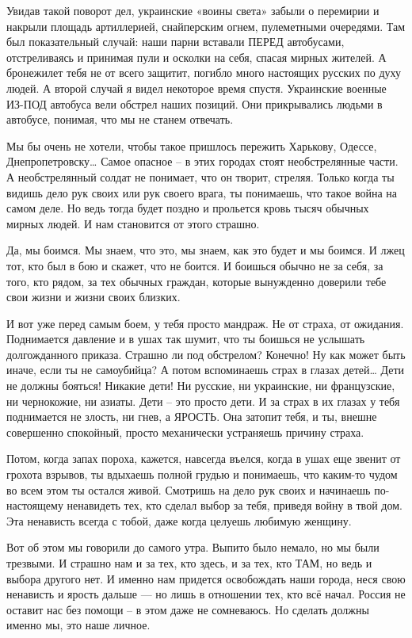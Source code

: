 Увидав такой поворот дел, украинские «воины света» забыли о перемирии и накрыли
площадь артиллерией, снайперским огнем, пулеметными очередями. Там был
показательный случай: наши парни вставали ПЕРЕД автобусами, отстреливаясь и
принимая пули и осколки на себя, спасая мирных жителей. А бронежилет тебя не от
всего защитит, погибло много настоящих русских по духу людей. А второй случай я
видел некоторое время спустя. Украинские военные ИЗ-ПОД автобуса вели обстрел
наших позиций. Они прикрывались людьми в автобусе, понимая, что мы не станем
отвечать.

Мы бы очень не хотели, чтобы такое пришлось пережить Харькову, Одессе,
Днепропетровску… Самое опасное – в этих городах стоят необстрелянные части. А
необстрелянный солдат не понимает, что он творит, стреляя. Только когда ты
видишь дело рук своих или рук своего врага, ты понимаешь, что такое война на
самом деле. Но ведь тогда будет поздно и прольется кровь тысяч обычных мирных
людей. И нам становится от этого страшно.

Да, мы боимся. Мы знаем, что это, мы знаем, как это будет и мы боимся. И лжец
тот, кто был в бою и скажет, что не боится. И боишься обычно не за себя, за
того, кто рядом, за тех обычных граждан, которые вынужденно доверили тебе свои
жизни и жизни своих близких.

И вот уже перед самым боем, у тебя просто мандраж. Не от страха, от ожидания.
Поднимается давление и в ушах так шумит, что ты боишься не услышать
долгожданного приказа. Страшно ли под обстрелом? Конечно! Ну как может быть
иначе, если ты не самоубийца? А потом вспоминаешь страх в глазах детей… Дети не
должны бояться! Никакие дети! Ни русские, ни украинские, ни французские, ни
чернокожие, ни азиаты. Дети – это просто дети. И за страх в их глазах у тебя
поднимается не злость, ни гнев, а ЯРОСТЬ. Она затопит тебя, и ты, внешне
совершенно спокойный, просто механически устраняешь причину страха.

Потом, когда запах пороха, кажется, навсегда въелся, когда в ушах еще звенит от
грохота взрывов, ты вдыхаешь полной грудью и понимаешь, что каким-то чудом во
всем этом ты остался живой. Смотришь на дело рук своих и начинаешь
по-настоящему ненавидеть тех, кто сделал выбор за тебя, приведя войну в твой
дом. Эта ненависть всегда с тобой, даже когда целуешь любимую женщину.

Вот об этом мы говорили до самого утра. Выпито было немало, но мы были
трезвыми. И страшно нам и за тех, кто здесь, и за тех, кто ТАМ, но ведь и
выбора другого нет. И именно нам придется освобождать наши города, неся свою
ненависть и ярость дальше — но лишь в отношении тех, кто всё начал. Россия не
оставит нас без помощи – в этом даже не сомневаюсь. Но сделать должны именно
мы, это наше личное.

